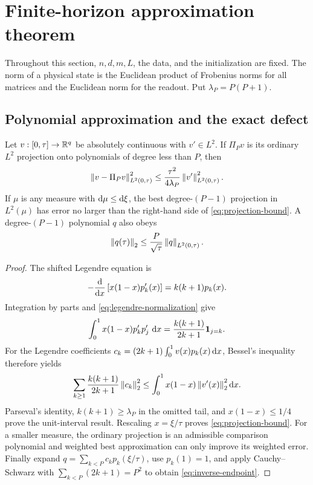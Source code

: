 \section{Finite-horizon approximation theorem}
\label{sec:theory}

Throughout this section, $n,d,m,L$, the data, and the initialization are fixed.
The norm of a physical state is the Euclidean product of Frobenius norms for
all matrices and the Euclidean norm for the readout.  Put
\(\lambda_P=P(P+1)\).

\subsection{Polynomial approximation and the exact defect}

\begin{lemma}
\label{lem:legendre}
Let $v:[0,\tau]\to\mathbb R^q$ be absolutely continuous with
$v'\in L^2$.  If $\Pi_Pv$ is its ordinary $L^2$ projection onto polynomials
of degree less than $P$, then
\begin{equation}
 \left\lVert v-\Pi_Pv\right\rVert_{L^2(0,\tau)}^2
 \le \frac{\tau^2}{4\lambda_P}\left\lVert v'\right\rVert_{L^2(0,\tau)}^2.
 \label{eq:projection-bound}
\end{equation}
If $\mu$ is any measure with $\mathop{}\!\mathrm d\mu\le\mathop{}\!\mathrm d\xi$, the best degree-$(P-1)$
projection in $L^2(\mu)$ has error no larger than the right-hand side of
\eqref{eq:projection-bound}.  A degree-$(P-1)$ polynomial $q$ also obeys
\begin{equation}
 \left\lVert q(\tau)\right\rVert_2\le \frac{P}{\sqrt\tau}\left\lVert q\right\rVert_{L^2(0,\tau)}.
 \label{eq:inverse-endpoint}
\end{equation}
\end{lemma}

\begin{proof}
The shifted Legendre equation is
\begin{equation}
 -\frac{\mathop{}\!\mathrm d}{\mathop{}\!\mathrm d x}\left[x(1-x)p_k'(x)\right]=k(k+1)p_k(x).
\end{equation}
Integration by parts and \eqref{eq:legendre-normalization} give
\begin{equation}
 \int_0^1x(1-x)p_k'p_j'\,\mathop{}\!\mathrm d x
 =\frac{k(k+1)}{2k+1}\mathbf1_{j=k}.
\end{equation}
For the Legendre coefficients
$c_k=(2k+1)\int_0^1v(x)p_k(x)\mathop{}\!\mathrm d x$, Bessel's inequality therefore yields
\begin{equation}
 \sum_{k\ge1}\frac{k(k+1)}{2k+1}\left\lVert c_k\right\rVert_2^2
 \le\int_0^1x(1-x)\left\lVert v'(x)\right\rVert_2^2\mathop{}\!\mathrm d x.
\end{equation}
Parseval's identity, $k(k+1)\ge\lambda_P$ in the omitted tail, and
$x(1-x)\le1/4$ prove the unit-interval result.  Rescaling
$x=\xi/\tau$ proves \eqref{eq:projection-bound}.  For a smaller measure,
the ordinary projection is an admissible comparison polynomial and weighted
best approximation can only improve its weighted error.  Finally expand
$q=\sum_{k<P}c_kp_k(\xi/\tau)$, use $p_k(1)=1$, and apply Cauchy--Schwarz with
$\sum_{k<P}(2k+1)=P^2$ to obtain \eqref{eq:inverse-endpoint}.
\end{proof}

